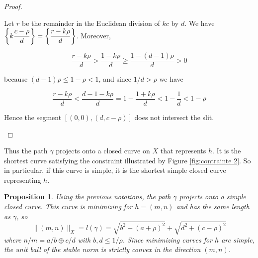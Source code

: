 \documentclass{article}
\newcommand{\St}[1]{\|#1\|_X}
\newtheorem{prop}[thm]{Proposition}
\theoremstyle{definition}
\begin{document}
\begin{proof}
\begin{itemize}
		Let $r$ be the remainder in the Euclidean division of $kc$ by $d$. We have $\left \{ k \mathlarger{\frac{c-\rho}{d}}\right \}=\left \{ \mathlarger{\frac{r-k\rho}{d}}\right \}$. Moreover,
		
		$$\frac{r-k\rho}{d} > \frac{1-k\rho}{d} \ge \frac{1-(d-1)\rho}{d} > 0$$ 
		
		because $(d-1)\rho \le 1 - \rho < 1$, and since $1/d > \rho$ we have
		
		$$ \frac{r-k\rho}{d} < \frac{d-1-k\rho}{d} = 1-\frac{1+k\rho}{d} < 1- \frac{1}{d} < 1-\rho$$ 
		
		 Hence the segment $[(0,0),(d,c-\rho)]$  does not intersect the slit.
		
		
	\end{itemize}
\end{proof}

Thus the path $\gamma$ projects onto a closed curve on $X$ that represents $h$. It is the shortest curve satisfying the constraint illustrated by Figure \ref{fig:contrainte 2}. So in particular, if this curve is simple, it is the shortest simple closed curve representing $h$.

\begin{prop}\label{2 parent}
	Using the previous notations, the path $\gamma$ projects onto a simple closed curve. This curve is minimizing for $h=(m,n)$ and has the same length as $\gamma$, so
	$$\St{(m,n)} = l(\gamma)= \sqrt{b^2+(a+\rho)^2}+\sqrt{d^2+(c-\rho)^2}$$
	where $n/m = a/b \oplus c/d$ with $b,d \le 1/\rho$. Since minimizing curves for $h$ are simple, the unit ball of the stable norm is strictly convex in the direction $(m,n)$.
\end{prop}
\end{document}
